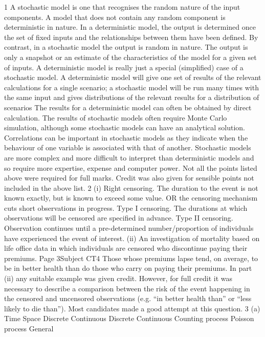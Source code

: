1
A stochastic model is one that recognises the random nature of the input components.
A model that does not contain any random component is deterministic in nature.
In a deterministic model, the output is determined once the set of fixed inputs and the
relationships between them have been defined.
By contrast, in a stochastic model the output is random in nature. The output is only a
snapshot or an estimate of the characteristics of the model for a given set of inputs.
A deterministic model is really just a special (simplified) case of a stochastic model.
A deterministic model will give one set of results of the relevant calculations for a single
scenario; a stochastic model will be run many times with the same input and gives
distributions of the relevant results for a distribution of scenarios
The results for a deterministic model can often be obtained by direct calculation.
The results of stochastic models often require Monte Carlo simulation, although some
stochastic models can have an analytical solution.
Correlations can be important in stochastic models as they indicate when the behaviour of
one variable is associated with that of another.
Stochastic models are more complex and more difficult to interpret than deterministic models
and so require more expertise, expense and computer power.
Not all the points listed above were required for full marks. Credit was also given for
sensible points not included in the above list.
2
(i)
Right censoring. The duration to the event is not known exactly,
but is known to exceed some value.
OR
the censoring mechanism cuts short observations in progress.
Type I censoring. The durations at which observations will be censored are specified
in advance.
Type II censoring. Observation continues until a pre-determined number/proportion
of individuals have experienced the event of interest.
(ii)
An investigation of mortality based on life office data in which
individuals are censored who discontinue paying their premiums.
Page 3Subject CT4 %
Those whose premiums lapse tend, on average, to be in better health
than do those who carry on paying their premiums.
In part (ii) any suitable example was given credit. However, for full credit it was necessary
to describe a comparison between the risk of the event happening in the censored and
uncensored observations (e.g. “in better health than” or “less likely to die than”). Most
candidates made a good attempt at this question.
3
(a)
Time Space
Discrete
Continuous
Discrete
Continuous
Counting
process Poisson
process
General
